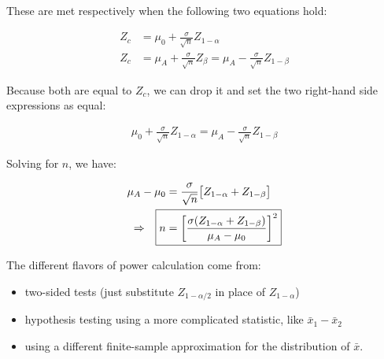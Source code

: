 \documentclass{article}
\begin{document}
These are met respectively when the following two equations hold:

\begin{align*}
Z_c &= \mu_0 + \frac{\sigma}{\sqrt{n}}Z_{1 - \alpha} \\
Z_c &= \mu_A + \frac{\sigma}{\sqrt{n}}Z_{\beta} = \mu_A - \frac{\sigma}{\sqrt{n}}Z_{1 - \beta}
\end{align*}

Because both are equal to $Z_c$, we can drop it and set the two right-hand side expressions as equal:

\begin{align*}
\mu_0 + \frac{\sigma}{\sqrt{n}}Z_{1 - \alpha} = \mu_A - \frac{\sigma}{\sqrt{n}}Z_{1 - \beta}
\end{align*}

Solving for $n$, we have:

\begin{align*}
\mu_A - \mu_0 &= \frac{\sigma}{\sqrt{n}}\big[Z_{1 - \alpha} + Z_{1 - \beta}\big] \\
\Rightarrow\quad \Aboxed{n &= \left[\frac{\sigma(Z_{1 - \alpha} + Z_{1 - \beta})}{\mu_A - \mu_0}\right]^2} \\
\end{align*}

The different flavors of power calculation come from:

\begin{itemize}
\item two-sided tests (just substitute $Z_{1-\alpha/2}$ in place of $Z_{1-\alpha}$)
\item hypothesis testing using a more complicated statistic, like $\bar{x}_1-\bar{x}_2$
\item using a different finite-sample approximation for the distribution of $\bar{x}$.
\end{itemize}
\end{document}
